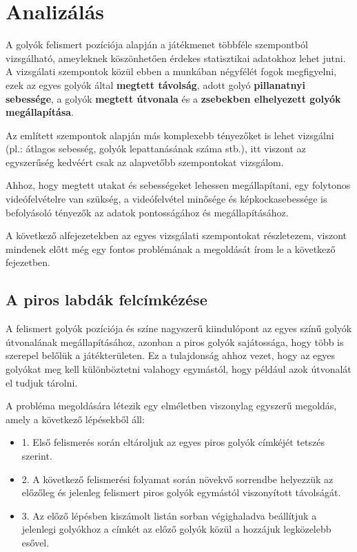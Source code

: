 \section{Analizálás}
A golyók felismert pozíciója alapján a játékmenet többféle szempontból vizsgálható, ameyleknek köszönhetően érdekes statisztikai adatokhoz lehet jutni. A vizsgálati szempontok közül ebben a munkában négyfélét fogok megfigyelni, ezek az egyes golyók által \textbf{megtett távolság}, adott golyó \textbf{pillanatnyi sebessége}, a golyók \textbf{megtett útvonala} és a \textbf{zsebekben elhelyezett golyók megállapítása}.
\par Az említett szempontok alapján más komplexebb tényezőket is lehet vizsgálni (pl.: átlagos sebesség, golyók lepattanásának száma stb.), itt viszont az egyszerűség kedvéért csak az alapvetőbb szempontokat vizsgálom.
\par Ahhoz, hogy megtett utakat és sebességeket lehessen megállapítani, egy folytonos videófelvételre van szükség, a videófelvétel minősége és képkockasebessége is befolyásoló tényezők az adatok pontosságához és megállapításához.
\par A következő alfejezetekben az egyes vizsgálati szempontokat részletezem, viszont mindenek előtt még egy fontos problémának a megoldását írom le a következő fejezetben.

\subsection{A piros labdák felcímkézése}
A felismert golyók pozíciója és színe nagyszerű kiindulópont az egyes színű golyók útvonalának megállapításához, azonban a piros golyók sajátossága, hogy több is szerepel belőlük a játékterületen. Ez a tulajdonság ahhoz vezet, hogy az egyes golyókat meg kell különböztetni valahogy egymástól, hogy például azok útvonalát el tudjuk tárolni.
\par A probléma megoldására létezik egy elméletben viszonylag egyszerű megoldás, amely a következő lépésekből áll:

\begin{itemize}
    \item 1. Első felismerés során eltároljuk az egyes piros golyók címkéjét tetszés szerint.
    \item 2. A következő felismerési folyamat során növekvő sorrendbe helyezzük az előzőleg és jelenleg felismert piros golyók egymástól viszonyított távolságát.
    \item 3. Az előző lépésben kiszámolt listán sorban végighaladva beállítjuk a jelenlegi golyókhoz a címkét az előző golyók közül a hozzájuk legközelebb esővel.
\end{itemize}

